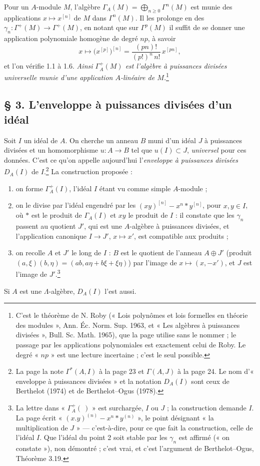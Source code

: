 \documentclass[11pt,a4paper]{article}
\begin{document}
Pour un $A$-module $M$, l'algèbre $\Gamma_A(M) = \bigoplus_{n \geqslant 0}
\Gamma^{n}(M)$ est munie des applications $x \mapsto x^{[n]}$ de $M$ dans
$\Gamma^{n}(M)$. Il les prolonge en des $\gamma_n : \Gamma^{+}(M) \to
\Gamma^{+}(M)$, en notant que sur $\Gamma^{p}(M)$ il suffit de se donner une
application polynomiale homogène de degré $np$, à savoir
\[
x \longmapsto \bigl(x^{[p]}\bigr)^{[n]} = \frac{(pn)!}{(p!)^{n}\, n!}\,
x^{[pn]} ,
\]
et l'on vérifie 1.1 à 1.6. \emph{Ainsi $\Gamma^{+}_A(M)$ est l'algèbre à
puissances divisées universelle munie d'une application $A$-linéaire de
$M$.}\footnote{C'est le théorème de N. Roby (« Lois polynômes et lois
formelles en théorie des modules », Ann. Éc. Norm. Sup. 1963, et « Les
algèbres à puissances divisées », Bull. Sc. Math. 1965), que la page
utilise sans le nommer ; le passage par les applications polynomiales est
exactement celui de Roby. Le degré « $np$ » est une lecture incertaine ;
c'est le seul possible.}

\subsection*{§ 3. L'enveloppe à puissances divisées d'un idéal}

Soit $I$ un idéal de $A$. On cherche un anneau $B$ muni d'un idéal $J$ à
puissances divisées et un homomorphisme $u : A \to B$ tel que $u(I) \subset
J$, \emph{universel} pour ces données. C'est ce qu'on appelle aujourd'hui
l'\emph{enveloppe à puissances divisées} $D_A(I)$ de
$I$.\footnote{La page la note $\Gamma^{*}(A, I)$ à la page 23 et
$\Gamma(A, J)$ à la page 24. Le nom d'« enveloppe à puissances divisées » et
la notation $D_A(I)$ sont ceux de Berthelot (1974) et de Berthelot--Ogus
(1978).} La construction proposée :
\begin{enumerate}
\item on forme $\Gamma^{+}_A(I)$, l'idéal $I$ étant vu comme simple
$A$-module ;
\item on le divise par l'idéal engendré par les $(xy)^{[n]} - x^{n} *
y^{[n]}$, pour $x, y \in I$, où $*$ est le produit de $\Gamma_A(I)$ et $xy$
le produit de $I$ : il constate que les $\gamma_n$ passent au quotient
$J'$, qui est une $A$-algèbre à puissances divisées, et l'application
canonique $I \to J'$, $x \mapsto x'$, est compatible aux produits ;
\item on recolle $A$ et $J'$ le long de $I$ : $B$ est le quotient de
l'anneau $A \oplus J'$ (produit $(a,\xi)(b,\eta) = (ab, a\eta + b\xi +
\xi\eta)$) par l'image de $x \mapsto (x, -x')$, et $J$ est l'image de
$J'$.\footnote{La lettre dans « $\Gamma^{+}_A(\ )$ » est surchargée, $I$ ou $J$ ;
la construction demande $I$. La page écrit « $(x.y)^{(n)} - x^{n} *
y^{(n)}$ », le point désignant « la multiplication de $J$ » — c'est-à-dire,
pour ce que fait la construction, celle de l'idéal $I$. Que l'idéal du point
2 soit stable par les $\gamma_n$ est affirmé (« on constate »), non
démontré ; c'est vrai, et c'est l'argument de Berthelot--Ogus, Théorème
3.19.}
\end{enumerate}
Si $A$ est une $\Lambda$-algèbre, $D_A(I)$ l'est aussi.
\end{document}
